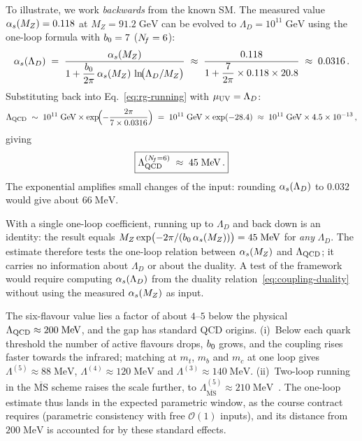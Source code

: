 \documentclass[11pt,a4paper]{article}
\begin{document}
To illustrate, we work \emph{backwards} from the known SM.  The measured
value $\alpha_s(M_Z) = 0.118$ at $M_Z = 91.2\;\text{GeV}$ can be evolved
to $\Lambda_D = 10^{11}\;\text{GeV}$ using the one-loop formula with
$b_0 = 7$ ($N_{\!f} = 6$):
\begin{equation}\label{eq:alpha-running}
  \alpha_s(\Lambda_D)
  \;=\; \frac{\alpha_s(M_Z)}{1 + \dfrac{b_0}{2\pi}\,
    \alpha_s(M_Z)\, \ln\!\bigl(\Lambda_D / M_Z\bigr)}
  \;\approx\; \frac{0.118}{1 + \dfrac{7}{2\pi} \times 0.118 \times 20.8}
  \;\approx\; 0.0316\,.
\end{equation}
Substituting back into Eq.~\eqref{eq:rg-running} with
$\mu_{\mathrm{UV}} = \Lambda_D$:
\begin{equation}\label{eq:lambda-qcd-estimate}
  \Lambda_{\mathrm{QCD}}
  \;\sim\; 10^{11}\;\text{GeV} \times
  \exp\!\Bigl(-\frac{2\pi}{7 \times 0.0316}\Bigr)
  \;=\; 10^{11}\;\text{GeV} \times
  \exp(-28.4)
  \;\approx\; 10^{11}\;\text{GeV} \times
  4.5 \times 10^{-13}\,,
\end{equation}
giving
\begin{equation}\label{eq:lambda-qcd-result}
  \boxed{\Lambda_{\mathrm{QCD}}^{(N_{\!f}=6)}
  \;\approx\; 45\;\text{MeV}\,.}
\end{equation}
The exponential amplifies small changes of the input: rounding
$\alpha_s(\Lambda_D)$ to $0.032$ would give about $66\;\text{MeV}$.

\begin{warningbox}[title={What this estimate tests}]
  With a single one-loop coefficient, running up to $\Lambda_D$ and back
  down is an identity: the result equals
  $M_Z \exp\bigl(-2\pi/(b_0\, \alpha_s(M_Z))\bigr) = 45\;\text{MeV}$
  for \emph{any} $\Lambda_D$.  The estimate therefore tests the one-loop
  relation between $\alpha_s(M_Z)$ and $\Lambda_{\mathrm{QCD}}$; it carries no
  information about $\Lambda_D$ or about the duality.  A test of the
  framework would require computing $\alpha_s(\Lambda_D)$ from the
  duality relation~\eqref{eq:coupling-duality} without using the
  measured $\alpha_s(M_Z)$ as input.
\end{warningbox}

The six-flavour value lies a factor of about $4$--$5$ below the
physical $\Lambda_{\mathrm{QCD}} \approx 200\;\text{MeV}$, and the gap has
standard QCD origins.  (i)~Below each quark threshold the number of
active flavours drops, $b_0$ grows, and the coupling rises faster
towards the infrared; matching at $m_t$, $m_b$ and $m_c$ at one loop
gives $\Lambda^{(5)} \approx 88\;\text{MeV}$,
$\Lambda^{(4)} \approx 120\;\text{MeV}$ and
$\Lambda^{(3)} \approx 140\;\text{MeV}$.  (ii)~Two-loop running in the
$\overline{\text{MS}}$ scheme raises the scale further, to
$\Lambda^{(5)}_{\overline{\text{MS}}} \approx 210\;\text{MeV}$~\cite{PDG2024}.
The one-loop estimate thus lands in the expected parametric window, as
the course contract requires (parametric consistency with free
$\mathcal{O}(1)$ inputs), and its distance from $200\;\text{MeV}$ is
accounted for by these standard effects.
\end{document}

